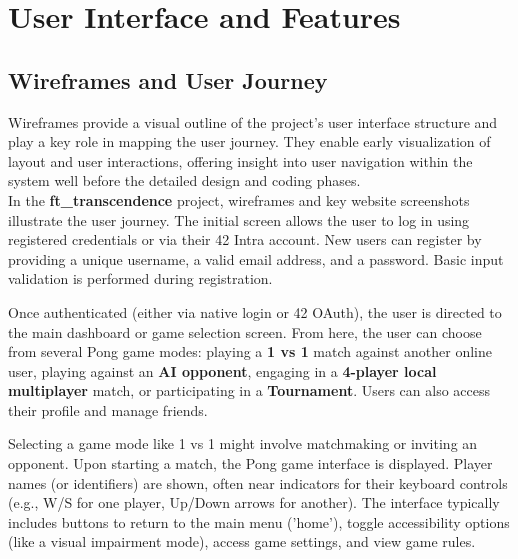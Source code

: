 \chapter{User Interface and Features}

\section{Wireframes and User Journey}

Wireframes provide a visual outline of the project’s user interface structure and play a key role in mapping the user journey. They enable early visualization of layout and user interactions, offering insight into user navigation within the system well before the detailed design and coding phases.\\
In the \textbf{ft\_transcendence} project, wireframes and key website screenshots illustrate the user journey. The initial screen allows the user to log in using registered credentials or via their 42 Intra account. New users can register by providing a unique username, a valid email address, and a password. Basic input validation is performed during registration.

\begin{figure}[H]
\end{figure}

Once authenticated (either via native login or 42 OAuth), the user is directed to the main dashboard or game selection screen. From here, the user can choose from several Pong game modes: playing a \textbf{1 vs 1} match against another online user, playing against an \textbf{AI opponent}, engaging in a \textbf{4-player local multiplayer} match, or participating in a \textbf{Tournament}. Users can also access their profile and manage friends.

\begin{figure}[H]
\end{figure}

Selecting a game mode like 1 vs 1 might involve matchmaking or inviting an opponent. Upon starting a match, the Pong game interface is displayed. Player names (or identifiers) are shown, often near indicators for their keyboard controls (e.g., W/S for one player, Up/Down arrows for another). The interface typically includes buttons to return to the main menu ('home'), toggle accessibility options (like a visual impairment mode), access game settings, and view game rules.

